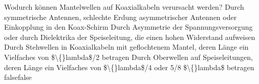     {Wodurch können Mantelwellen auf Koaxialkabeln verursacht werden?}
    {Durch symmetrische Antennen, schlechte Erdung asymmetrischer Antennen oder Einkopplung in den Koax-Schirm}
    {Durch Asymmetrie der Spannungsversorgung oder durch Dielektrika der Speiseleitung, die einen hohen Widerstand aufweisen}
    {Durch Stehwellen in Koaxialkabeln mit geflochtenem Mantel, deren Länge ein Vielfaches von \$\textbackslash\{\}lambda\$/2 betragen}
    {Durch Oberwellen auf Speiseleitungen, deren Länge ein Vielfaches von \$\textbackslash\{\}lambda\$/4 oder 5/8 \$\textbackslash\{\}lambda\$ betragen}
    {false}{false}